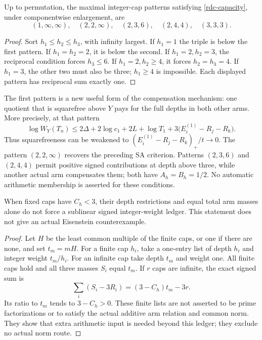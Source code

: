 \begin{proposition}\label{rdc-five}
Up to permutation, the maximal integer-cap patterns satisfying
\eqref{rdc-capacity}, under componentwise enlargement, are
\begin{equation}\label{rdc-patterns}
 (1,\infty,\infty),\quad(2,2,\infty),\quad
 (2,3,6),\quad(2,4,4),\quad(3,3,3).
\end{equation}
\end{proposition}
\begin{proof}
Sort $h_1\le h_2\le h_3$, with infinity largest. If $h_1=1$ the
triple is below the first pattern. If $h_1=h_2=2$, it is below the
second. If $h_1=2,h_2=3$, the reciprocal condition forces $h_3\le6$.
If $h_1=2,h_2\ge4$, it forces $h_2=h_3=4$.
If $h_1=3$, the other two must also be three; $h_1\ge4$ is
impossible. Each displayed pattern has reciprocal sum exactly one.
\end{proof}

The first pattern is a new useful form of the compensation mechanism:
one quotient that is squarefree above $Y$ pays for the full depths
in both other arms. More precisely, at that pattern
\begin{equation}\label{rdc-one-arm}
 \log W_Y(T_n)\le2\Delta+2\log c_1+2L+\log T_1
                 +3\bigl(E_i^{(1)}-R_j-R_k\bigr).
\end{equation}
Thus squarefreeness can be weakened to
$(E_i^{(1)}-R_j-R_k)_+/t\to0$. The pattern $(2,2,\infty)$
recovers the preceding SA criterion. Patterns $(2,3,6)$ and $(2,4,4)$
permit positive signed contributions at depth above three, while
another actual arm compensates them; both have $A_h=B_h=1/2$.
No automatic arithmetic membership is asserted for these conditions.

\begin{proposition}
\label{rdc-abstract-sharpness}
When fixed caps have $C_h<3$, their depth restrictions and equal
total arm masses alone do not force a sublinear signed integer-weight
ledger. This statement does not give an actual Eisenstein counterexample.
\end{proposition}
\begin{proof}
Let $H$ be the least common multiple of the finite caps, or one if
there are none, and set $t_m=mH$. For a finite cap $h_i$, take a
one-entry list of depth $h_i$ and integer weight $t_m/h_i$.
For an infinite cap take depth $t_m$ and weight one. All finite caps
hold and all three masses $S_i$ equal $t_m$. If $r$ caps are infinite,
the exact signed sum is
\[
 \sum_i(S_i-3R_i)=(3-C_h)t_m-3r.
\]
Its ratio to $t_m$ tends to $3-C_h>0$. These finite lists are not
asserted to be prime factorizations or to satisfy the actual additive
arm relation and common norm. They show that extra arithmetic input
is needed beyond this ledger; they exclude no actual norm route.
\end{proof}

